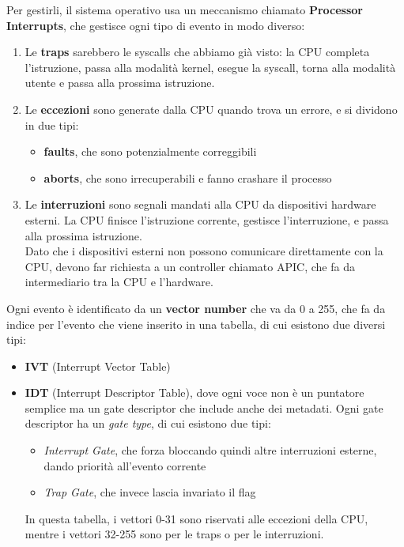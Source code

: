 \documentclass[11pt, a4paper, titlepage, oneside]{scrbook}
\begin{document}
Per gestirli, il sistema operativo usa un meccanismo chiamato \textbf{Processor Interrupts}, che gestisce ogni tipo di evento in modo diverso:
\begin{enumerate}
    \item Le \textbf{traps} sarebbero le syscalls che abbiamo già visto: la CPU completa l'istruzione, passa alla modalità kernel, esegue la syscall, torna alla modalità utente e passa alla prossima istruzione.
    \item Le \textbf{eccezioni} sono generate dalla CPU quando trova un errore, e si dividono in due tipi:
    \begin{itemize}
        \item \textbf{faults}, che sono potenzialmente correggibili
        \item \textbf{aborts}, che sono irrecuperabili e fanno crashare il processo
    \end{itemize}
    \item Le \textbf{interruzioni} sono segnali mandati alla CPU da dispositivi hardware esterni. La CPU finisce l'istruzione corrente, gestisce l'interruzione, e passa alla prossima istruzione. \\ \NB Dato che i dispositivi esterni non possono comunicare direttamente con la CPU, devono far richiesta a un controller chiamato APIC, che fa da intermediario tra la CPU e l'hardware.
\end{enumerate}

Ogni evento è identificato da un \textbf{vector number} che va da 0 a 255, che fa da indice per l'evento che viene inserito in una tabella, di cui esistono due diversi tipi:
\begin{itemize}
    \item \textbf{IVT} (Interrupt Vector Table)
    \item \textbf{IDT} (Interrupt Descriptor Table), dove ogni voce non è un puntatore semplice ma un gate descriptor che include anche dei metadati. Ogni gate descriptor ha un \textit{gate type}, di cui esistono due tipi:
    \begin{itemize}
        \item \textit{Interrupt Gate}, che forza  bloccando quindi altre interruzioni esterne, dando priorità all'evento corrente
        \item \textit{Trap Gate}, che invece lascia invariato il flag 
    \end{itemize}
    In questa tabella, i vettori 0-31 sono riservati alle eccezioni della CPU, mentre i vettori 32-255 sono per le traps o per le interruzioni. 
\end{itemize}
\end{document}
